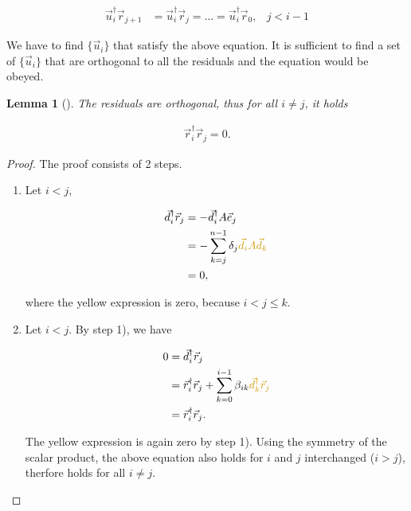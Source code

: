 \documentclass{article}
\theoremstyle{plain} %
\newtheorem{lemma}[theorem]{Lemma}
\theoremstyle{remark} %
\numberwithin{equation}{section}
\begin{document}
\begin{align*}
    \vec{u}_i^{\dagger} \vec{r}_{j+1} &= \vec{u}_i^{\dagger} \vec{r}_j = \dots = \vec{u}_i^{\dagger} \vec{r}_0, &j<i-1
\end{align*}

We have to find $\{\vec{u}_i\}$ that satisfy the above equation. It is sufficient to find a set of $\{\vec{u}_i\}$ that are orthogonal to all the residuals and the equation would be obeyed.

\begin{lemma}[]
\label{lem:rorthogonality}
The residuals are orthogonal, thus for all $i \neq j$, it holds

\begin{align*}
    \vec{r}_i^{\dagger} \vec{r}_j = 0.
\end{align*}

\end{lemma}

\begin{proof}

The proof consists of 2 steps.

\begin{enumerate}[label={\arabic*)}]
    \item Let $i<j$,

    \begin{align*}
        \vec{d}_i^{\dagger} \vec{r}_j &= - \vec{d}_i^{\dagger} A \vec{e}_j \\
                                      &= - \sum_{k=j}^{n-1} \delta_j \textcolor{cyellow}{\vec{d}_i A \vec{d}_k} \\
                                      &= 0,
    \end{align*}

    where the \textcolor{cyellow}{yellow} expression is \textcolor{cyellow}{zero}, because $i<j\leq k$.

    \item Let $i<j$. By step 1), we have

    \begin{align*}
        0 &= \vec{d}_i^{\dagger} \vec{r}_j \\
          &= \vec{r}_i^{\dagger} \vec{r}_j + \sum_{k=0}^{i-1} \beta_{ik} \textcolor{cyellow}{\vec{d}_k^{\dagger} \vec{r}_j} \\
          &= \vec{r}_i^{\dagger} \vec{r}_j.
    \end{align*}

    The \textcolor{cyellow}{yellow} expression is again \textcolor{cyellow}{zero} by step 1). Using the symmetry of the scalar product, the above equation also holds for $i$ and $j$ interchanged ($i>j$), therfore holds for all $i \neq j$.

\end{enumerate}

\end{proof}
\end{document}

